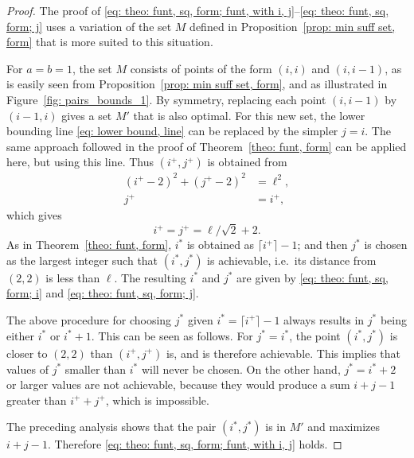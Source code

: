\documentclass[12pt, a4paper]{article}
\newcommand{\len}{\ell} %
\newcommand{\isolr}{i^+}
\newcommand{\jsolr}{j^+}
\newcommand{\isoli}{i^\ast}
\newcommand{\jsoli}{j^\ast}
\newcommand{\mss}{M}
\begin{document}
\begin{proof}
The proof of \eqref{eq: theo: funt, sq, form; funt, with i, j}--\eqref{eq: theo: funt, sq, form; j}
uses a variation of the set $\mss$ defined in Proposition~\ref{prop: min suff set, form} that is more suited to this situation.

For $a=b=1$, the set $\mss$ consists of points of the form $(i,i)$ and $(i,i-1)$, as is easily seen from Proposition~\ref{prop: min suff set, form}, and as illustrated in Figure~\ref{fig: pairs_bounds_1}. By symmetry, replacing each point $(i,i-1)$ by $(i-1,i)$ gives a set $\mss'$ that is also optimal. For this new set, the lower bounding line \eqref{eq: lower bound, line} can be replaced by the simpler $j=i$. The same approach followed in the proof of Theorem~\ref{theo: funt, form} can be applied here, but using this line. Thus $(\isolr, \jsolr)$ is obtained from
\begin{align}
(\isolr-2)^2 + (\jsolr-2)^2  &= \len^2, \\
\jsolr &= \isolr,
\end{align}
which gives
\begin{equation}
\label{eq: theo: funt, sq, form; proof 1}
\isolr = \jsolr = \len/\sqrt{2} + 2.
\end{equation}
As in Theorem~\ref{theo: funt, form}, $\isoli$ is obtained as $\lceil \isolr \rceil-1$; and then $\jsoli$ is chosen as the largest integer such that $(\isoli, \jsoli)$ is achievable, i.e.~its distance from $(2, 2)$ is less than $\len$. The resulting $\isoli$ and $\jsoli$ are given by \eqref{eq: theo: funt, sq, form; i} and \eqref{eq: theo: funt, sq, form; j}.

The above procedure for choosing $\jsoli$ given $\isoli = \lceil \isolr \rceil-1$ always results in $\jsoli$ being either $\isoli$ or $\isoli+1$. This can be seen as follows. For $\jsoli = \isoli$, the point $(\isoli, \jsoli)$ is closer to $(2,2)$ than $(\isolr, \jsolr)$ is, and is therefore achievable. This implies that values of $\jsoli$ smaller than $\isoli$ will never be chosen. On the other hand, $\jsoli = \isoli+2$ or larger values are not achievable, because they would produce a sum $i+j-1$ greater than $\isolr+\jsolr$, which is impossible.

The preceding analysis shows that the pair $(\isoli,\jsoli)$ is in $\mss'$ and maximizes $i+j-1$. Therefore \eqref{eq: theo: funt, sq, form; funt, with i, j} holds.


\end{proof}
\end{document}
